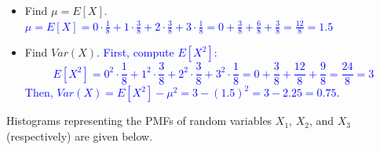 \documentclass[10pt]{article}
\begin{document}
\begin{itemize}
    \item[(a)] Find $\mu=E[X]$.
    \vfill
    \textcolor{blue}{
    $\displaystyle \mu = E[X] = 0\cdot\frac18 + 1\cdot\frac38 + 2\cdot\frac38 + 3\cdot\frac18 = 0 + \frac38 + \frac{6}{8} + \frac{3}{8} = \frac{12}{8} = 1.5$
    }
        \vfill
    \item[(b)] Find $Var(X)$.
        \vfill
    \textcolor{blue}{
    First, compute $E[X^2]$: 
    \[
    E[X^2] = 0^2\cdot\frac18 + 1^2\cdot\frac38 + 2^2\cdot\frac38 + 3^2\cdot\frac18 = 0 + \frac38 + \frac{12}{8} + \frac{9}{8} = \frac{24}{8} = 3
    \]
    Then, $Var(X) = E[X^2] - \mu^2 = 3 - (1.5)^2 = 3 - 2.25 = 0.75$.
    }
\end{itemize}

\newpage

\exercise{} Histograms representing the PMFs of random variables $X_1$, $X_2$, and $X_3$ (respectively) are given below.
\end{document}
